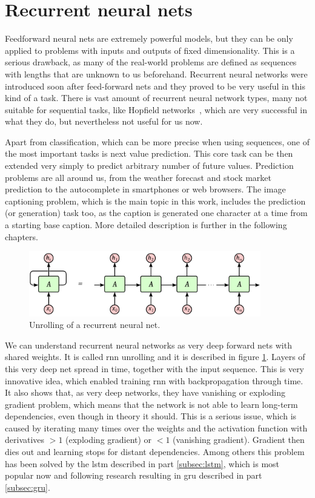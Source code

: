	\section{Recurrent neural nets}
Feedforward neural nets are extremely powerful models, but they can be only applied to problems with inputs and outputs of fixed dimensionality. This is a serious drawback, as many of the real-world problems are defined as sequences with lengths that are unknown to us beforehand. Recurrent neural networks were introduced soon after feed-forward nets and they proved to be very useful in this kind of a task. There is vast amount of recurrent neural network types, many not suitable for sequential tasks, like Hopfield networks~\cite{hopfield1982neural}, which are very successful in what they do, but nevertheless not useful for us now.

Apart from classification, which can be more precise when using sequences, one of the most important tasks is next value prediction. This core task can be then extended very simply to predict arbitrary number of future values. Prediction problems are all around us, from the weather forecast and stock market prediction to the autocomplete in smartphones or web browsers. The image captioning problem, which is the main topic in this work, includes the prediction (or generation) task too, as the caption is generated one character at a time from a starting base caption. More detailed description is further in the following chapters.

\begin{figure}[!t]
	\centering
	\includegraphics[width=0.9\textwidth]{fig/rnn-unrolled.pdf}
	\caption{Unrolling of a recurrent neural net.
		\label{fig:rnn-unroll}}
\end{figure}

We can understand recurrent neural networks as very deep forward nets with shared weights. It is called \gls{rnn} unrolling and it is described in figure \ref{fig:rnn-unroll}. Layers of this very deep net spread in time, together with the input sequence. This is very innovative idea, which enabled training \gls{rnn} with backpropagation through time. It also shows that, as very deep networks, they have vanishing or exploding gradient problem, which means that the network is not able to learn long-term dependencies, even though in theory it should. This is a serious issue, which is caused by iterating many times over the weights and the activation function with derivatives $>1$ (exploding gradient) or $<1$ (vanishing gradient). Gradient then dies out and learning stops for distant dependencies. Among others this problem has been solved by the \gls{lstm} described in part \ref{subsec:lstm}, which is most popular now and following research resulting in \gls{gru} described in part \ref{subsec:gru}.

